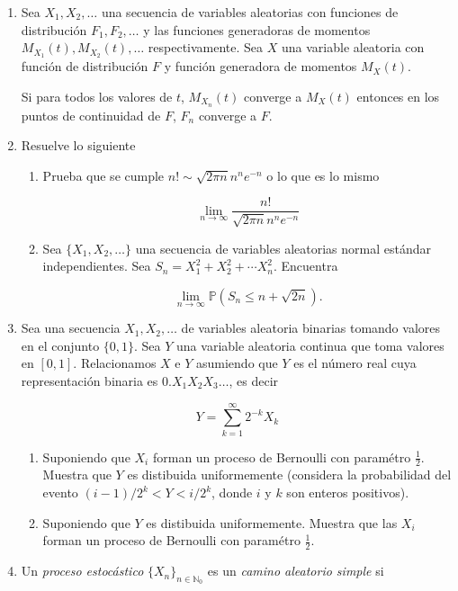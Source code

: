 \documentclass[a4paper,11pt]{report}
\begin{document}
\begin{enumerate}
\item Sea $X_1, X_2, \dots $ una secuencia de variables aleatorias con funciones de distribuci\'on $F_1, F_2, \dots$ y las funciones generadoras de momentos $M_{X_1}(t), M_{X_2}(t), \dots$ respectivamente. Sea $X$ una variable aleatoria con funci\'on de distribuci\'on $F$ y funci\'on generadora de momentos $M_X(t)$.

Si para todos los valores de $t$, $M_{X_n}(t)$ converge a $M_{X}(t)$ entonces en los puntos de continuidad de $F$, $F_n$ converge a $F$.



\item Resuelve lo siguiente

\begin{enumerate}
	\item Prueba que se cumple  $n! \sim \sqrt{2\pi n}n^ne^{-n}$ o lo que es lo mismo
	
	\[
	\lim_{n \rightarrow \infty}\dfrac{n!}{\sqrt{2\pi n}n^ne^{-n}}
	\]
	
	\item Sea $\{X_1, X_2, \dots  \}$ una secuencia de variables aleatorias normal est\'andar independientes. Sea $S_n = X_1^2 + X_2^2 + \cdots X_n^2$. Encuentra
	
	\[
	\lim_{n \rightarrow \infty}\mathbb{P}(S_n \leq n + \sqrt{2n}).
	\] 
\end{enumerate}
\item Sea una secuencia $X_1, X_2, \dots$ de variables aleatoria binarias tomando valores en el conjunto $\{0, 1\}$. Sea $Y$ una variable aleatoria continua que toma valores en $[0, 1]$. Relacionamos $X$ e $Y$ asumiendo que $Y$ es el n\'umero real cuya representaci\'on binaria es $0.X_1X_2X_3\dots$, es decir

\[
Y = \sum_{k = 1}^{\infty}2^{-k}X_k
\]

\begin{enumerate}
	\item Suponiendo que $X_i$ forman un proceso de Bernoulli con param\'etro $\frac{1}{2}$. Muestra que $Y$ es distibuida uniformemente (considera la probabilidad del evento $(i - 1)/2^k < Y < i/2^k$, donde $i$ y $k$ son enteros positivos).
	\item Suponiendo que $Y$ es distibuida uniformemente. Muestra que las $X_i$ forman un proceso de Bernoulli con param\'etro $\frac{1}{2}$.
\end{enumerate}
\item  Un \textit{proceso estoc\'astico} $\{ X_n\}_{n \in \mathbb{N}_0}$ es un \textit{camino aleatorio simple} si


\end{enumerate}
\end{document}
